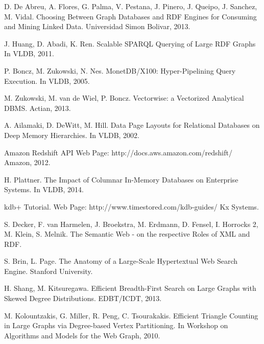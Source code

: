 \begin{thebibliography}{1}
D. De Abreu, A. Flores, G. Palma, V. Pestana, J. Pinero, J. Queipo, J. Sanchez, M. Vidal.
Choosing Between Graph Databases and RDF Engines for Consuming and Mining Linked Data.
Universidad Simon Bolivar, 2013.

J. Huang, D. Abadi, K. Ren.
Scalable SPARQL Querying of Large RDF Graphs
In VLDB, 2011.

P. Boncz, M. Zukowski, N. Nes.
MonetDB/X100: Hyper-Pipelining Query Execution.
In VLDB, 2005.

M. Zukowski, M. van de Wiel, P. Boncz.
Vectorwise: a Vectorized Analytical DBMS.
Actian, 2013.

A. Ailamaki, D. DeWitt, M. Hill.
Data Page Layouts for Relational Databases on Deep Memory Hierarchies.
In VLDB, 2002.

Amazon Redshift API
Web Page: http://docs.aws.amazon.com/redshift/
Amazon, 2012.

H. Plattner.
The Impact of Columnar In-Memory Databases on Enterprise Systems.
In VLDB, 2014.

kdb+ Tutorial.
Web Page: http://www.timestored.com/kdb-guides/
Kx Systems.

S. Decker, F. van Harmelen, J. Broekstra, M. Erdmann, D. Fensel, I. Horrocks 2, M. Klein, S. Melnik.
The Semantic Web - on the respective Roles of XML and RDF.

S. Brin, L. Page.
The Anatomy of a Large-Scale Hypertextual Web Search Engine.
Stanford University.

H. Shang, M. Kitsuregawa.
Efficient Breadth-First Search on Large Graphs with
Skewed Degree Distributions.
EDBT/ICDT, 2013.

M. Kolountzakis, G. Miller, R. Peng, C. Tsourakakis.
Efficient Triangle Counting in Large Graphs via Degree-based Vertex
Partitioning.
In Workshop on Algorithms and Models for the Web Graph, 2010.




\end{thebibliography}


